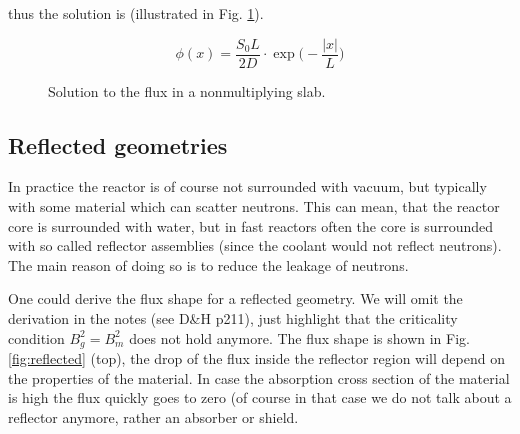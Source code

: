 \noindent thus the solution is (illustrated in Fig. \ref{fig:nonmultislab}).

$$\phi(x)=\frac{S_0L}{2D}\cdot\exp\Big(-\frac{|x|}{L}\Big)$$


\begin{figure}[ht!]
\protect {}\protect
\caption{\label{fig:nonmultislab} \footnotesize{Solution to the flux in a nonmultiplying slab.}}
\end{figure} 

\subsection{Reflected geometries}

In practice the reactor is of course not surrounded with vacuum, but typically with some material which can scatter neutrons. This can mean, that the reactor core is surrounded with water, but in fast reactors often the core is surrounded with so called reflector assemblies (since the coolant would not reflect neutrons). The main reason of doing so is to reduce the leakage of neutrons.

One could derive the flux shape for a reflected geometry. We will omit the derivation in the notes (see D\&H p211), just highlight that the criticality condition $B_g^2=B_m^2$ does not hold anymore. The flux shape is shown in Fig. \ref{fig:reflected} (top), the drop of the flux inside the reflector region will depend on the properties of the material. In case the absorption cross section of the material is high the flux quickly goes to zero (of course in that case we do not talk about a reflector anymore, rather an absorber or shield. 

